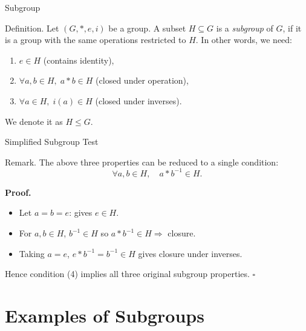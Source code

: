 \begin{frame}{Subgroup}
\begin{block}{Definition.}  
Let $(G, *, e, i)$ be a group. A subset \(H \subseteq G\) is a \emph{subgroup} of \(G\), if it is a group with the same operations restricted to $H$. In other words, we need:

\begin{enumerate}
  \item \(e \in H\) \hfill (contains identity),
  \item \(\forall a,b \in H,\; a*b \in H\) \hfill (closed under operation),
  \item \(\forall a \in H,\; i(a) \in H\) \hfill (closed under inverses).
\end{enumerate}

We denote it as \(H \leq G.\)
\end{block}
\end{frame}

\begin{frame}{Simplified Subgroup Test}
\begin{block}{Remark.}  
The above three properties can be reduced to a single condition:
\[
\forall a,b \in H,\quad a * b^{-1} \in H.
\]

\textbf{Proof.}
\begin{itemize}
  \item Let \(a=b=e\): gives \(e\in H\).
  \item For \(a,b\in H\), \(b^{-1}\in H\) so \(a*b^{-1}\in H \Rightarrow\) closure.
  \item Taking \(a=e\), \(e*b^{-1}=b^{-1}\in H\) gives closure under inverses.
\end{itemize}

Hence condition (4) implies all three original subgroup properties. \(\square\)
\end{block}
\end{frame}

\section{Examples of Subgroups}

